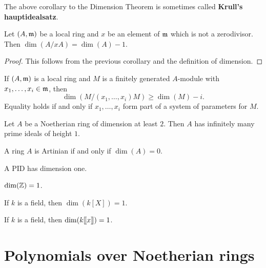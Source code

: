 \documentclass{ximera}
\begin{document}
\begin{remark}
  The above corollary to the Dimension Theorem is sometimes called
  \textbf{Krull's hauptidealsatz}.
\end{remark}

\begin{corollary}\label{C:nzdd-1}
  Let $(A,\mathfrak{m})$ be a local ring and $x$ be an element of $\mathfrak{m}$ which is
  not a zerodivisor. Then $\dim(A/xA) = \dim(A)-1$.
  \begin{proof}
    This follows from the previous corollary and the definition of
    dimension.
  \end{proof}
\end{corollary}


\begin{exercise}
  If $(A,\mathfrak{m})$ is a local ring and $M$ is a finitely generated
  $A$-module with $x_1,\dots,x_i\in\mathfrak{m}$, then
  \[
  \dim(M/(x_1,\dots,x_i)M)\ge \dim(M) -i.
  \]
  Equality holds if and only if $x_1,\dots,x_i$ form part of a system
  of parameters for $M$.
\end{exercise}

\begin{exercise}
  Let $A$ be a Noetherian ring of dimension at least $2$. Then $A$ has
  infinitely many prime ideals of height $1$.
\end{exercise}

\begin{example}
  A ring $A$ is Artinian if and only if $\dim(A) =
  0$. 
\end{example}

\begin{example}
  A PID has dimension one.
\end{example}

\begin{example}
  $\dim(\mathbb Z) = 1$.
\end{example}

\begin{example}
  If $k$ is a field, then $\dim(k[X]) = 1$.
\end{example}

\begin{example}
  If $k$ is a field, then $\dim(k[\hspace{-0.25ex}[ x ]\hspace{-0.25ex}]) = 1$.
\end{example}


\section{Polynomials over Noetherian rings}
\end{document}
